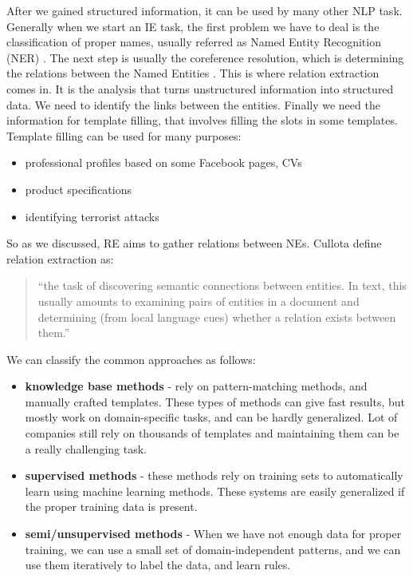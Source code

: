 After we gained structured information, it can be used by many other NLP task. Generally when we start an IE task, the first problem we have to deal is the classification of proper names, usually referred as Named Entity Recognition (NER) \cite{RelationE}. The next step is usually the coreference resolution, which is determining the relations between the Named Entities \cite{Jurafsky:2009}. This is where relation extraction comes in. It is the analysis that turns unstructured information into structured data. We need to identify the links between the entities. Finally we need the information for template filling, that involves filling the slots in some templates. Template filling can be used for many purposes:

\begin{itemize}
	\item professional profiles based on some Facebook pages, CVs
	\item product specifications
	\item identifying terrorist attacks
\end{itemize}

So as we discussed, RE aims to gather relations between NEs. Cullota \cite{Cullota06} define relation extraction as:
\begin{quotation}
	“the task of discovering semantic connections between entities. In text,
	this usually amounts to examining pairs of entities in a document and
	determining (from local language cues) whether a relation exists between
	them.”
\end{quotation}
We can classify the common approaches as follows:

\begin{itemize}
	\item \textbf{knowledge base methods} - rely on pattern-matching methods, and manually crafted templates. These types of methods can give fast results, but mostly work on domain-specific tasks, and can be hardly generalized. Lot of companies still rely on thousands of templates and maintaining them can be a really challenging task. 
	\item \textbf{supervised methods} - these methods rely on training sets to automatically learn using machine learning methods. These systems are easily generalized if the proper training data is present.
	\item \textbf{semi/unsupervised methods} - When we have not enough data for proper training, we can use a small set of domain-independent patterns, and we can use them iteratively to label the data, and learn rules.
\end{itemize}

